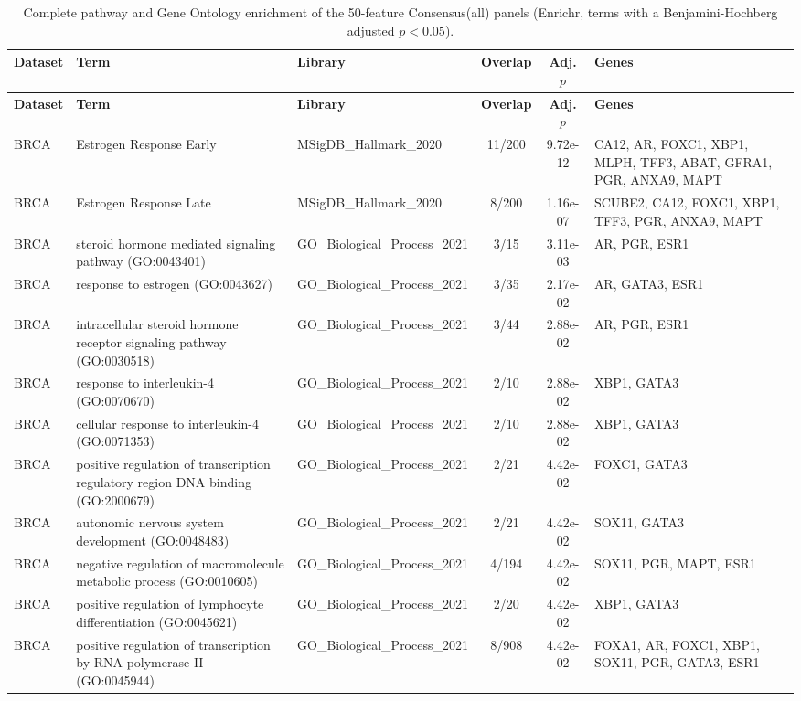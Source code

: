 \documentclass[utf8]{frontiers_suppmat}
\begin{document}
\begin{longtable}{lp{4.2cm}p{2.6cm}ccp{3.4cm}}
\caption{Complete pathway and Gene Ontology enrichment of the 50-feature Consensus(all) panels (Enrichr, terms with a Benjamini-Hochberg adjusted $p<0.05$).}\label{tab:S3}\\
\hline
\textbf{Dataset} & \textbf{Term} & \textbf{Library} & \textbf{Overlap} & \textbf{Adj. $p$} & \textbf{Genes} \\
\hline
\endfirsthead
\hline
\textbf{Dataset} & \textbf{Term} & \textbf{Library} & \textbf{Overlap} & \textbf{Adj. $p$} & \textbf{Genes} \\
\hline
\endhead
\hline
\endfoot
BRCA & Estrogen Response Early & MSigDB\_Hallmark\_2020 & 11/200 & 9.72e-12 & CA12, AR, FOXC1, XBP1, MLPH, TFF3, ABAT, GFRA1, PGR, ANXA9, MAPT \\
BRCA & Estrogen Response Late & MSigDB\_Hallmark\_2020 & 8/200 & 1.16e-07 & SCUBE2, CA12, FOXC1, XBP1, TFF3, PGR, ANXA9, MAPT \\
BRCA & steroid hormone mediated signaling pathway (GO:0043401) & GO\_Biological\_Process\_2021 & 3/15 & 3.11e-03 & AR, PGR, ESR1 \\
BRCA & response to estrogen (GO:0043627) & GO\_Biological\_Process\_2021 & 3/35 & 2.17e-02 & AR, GATA3, ESR1 \\
BRCA & intracellular steroid hormone receptor signaling pathway (GO:0030518) & GO\_Biological\_Process\_2021 & 3/44 & 2.88e-02 & AR, PGR, ESR1 \\
BRCA & response to interleukin-4 (GO:0070670) & GO\_Biological\_Process\_2021 & 2/10 & 2.88e-02 & XBP1, GATA3 \\
BRCA & cellular response to interleukin-4 (GO:0071353) & GO\_Biological\_Process\_2021 & 2/10 & 2.88e-02 & XBP1, GATA3 \\
BRCA & positive regulation of transcription regulatory region DNA binding (GO:2000679) & GO\_Biological\_Process\_2021 & 2/21 & 4.42e-02 & FOXC1, GATA3 \\
BRCA & autonomic nervous system development (GO:0048483) & GO\_Biological\_Process\_2021 & 2/21 & 4.42e-02 & SOX11, GATA3 \\
BRCA & negative regulation of macromolecule metabolic process (GO:0010605) & GO\_Biological\_Process\_2021 & 4/194 & 4.42e-02 & SOX11, PGR, MAPT, ESR1 \\
BRCA & positive regulation of lymphocyte differentiation (GO:0045621) & GO\_Biological\_Process\_2021 & 2/20 & 4.42e-02 & XBP1, GATA3 \\
BRCA & positive regulation of transcription by RNA polymerase II (GO:0045944) & GO\_Biological\_Process\_2021 & 8/908 & 4.42e-02 & FOXA1, AR, FOXC1, XBP1, SOX11, PGR, GATA3, ESR1 \\

\end{longtable}
\end{document}

